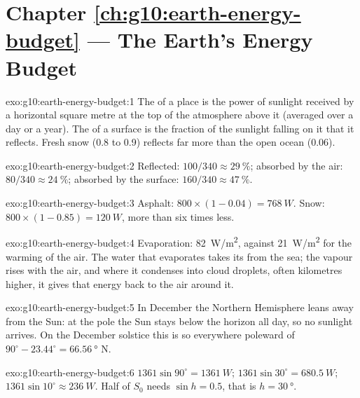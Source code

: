 \section*{Chapter \ref{ch:g10:earth-energy-budget} --- The Earth's Energy Budget}

\begin{solution}{exo:g10:earth-energy-budget:1}
The  of a place is the power of sunlight received by a horizontal
square metre at the top of the atmosphere above it (averaged over a day or a
year). The  of a surface is the fraction of the sunlight falling on it
that it reflects. Fresh snow (0.8 to 0.9) reflects far more than the open
ocean (0.06).
\end{solution}

\begin{solution}{exo:g10:earth-energy-budget:2}
Reflected: $100/340 \approx \qty{29}{\percent}$; absorbed by the air:
$80/340 \approx \qty{24}{\percent}$; absorbed by the surface: $160/340
\approx \qty{47}{\percent}$.
\end{solution}

\begin{solution}{exo:g10:earth-energy-budget:3}
Asphalt: $800 \times (1 - 0.04) = \qty{768}{W}$. Snow: $800 \times (1 -
0.85) = \qty{120}{W}$, more than six times less.
\end{solution}

\begin{solution}{exo:g10:earth-energy-budget:4}
Evaporation: \qty{82}{W/m^2}, against \qty{21}{W/m^2} for the warming of the
air. The water that evaporates takes its  from the sea; the vapour
rises with the air, and where it condenses into cloud droplets, often
kilometres higher, it gives that energy back to the air around it.
\end{solution}

\begin{solution}{exo:g10:earth-energy-budget:5}
In December the Northern Hemisphere leans away from the Sun: at the pole the
Sun stays below the horizon all day, so no sunlight arrives. On the December
solstice this is so everywhere poleward of $90^\circ - 23.44^\circ =
\qty{66.56}{\degree}$ N.
\end{solution}

\begin{solution}{exo:g10:earth-energy-budget:6}
$1361 \sin 90^\circ = \qty{1361}{W}$; $1361 \sin 30^\circ =
\qty{680.5}{W}$; $1361 \sin 10^\circ \approx \qty{236}{W}$. Half of $S_0$
needs $\sin h = 0.5$, that is $h = \qty{30}{\degree}$.
\end{solution}

